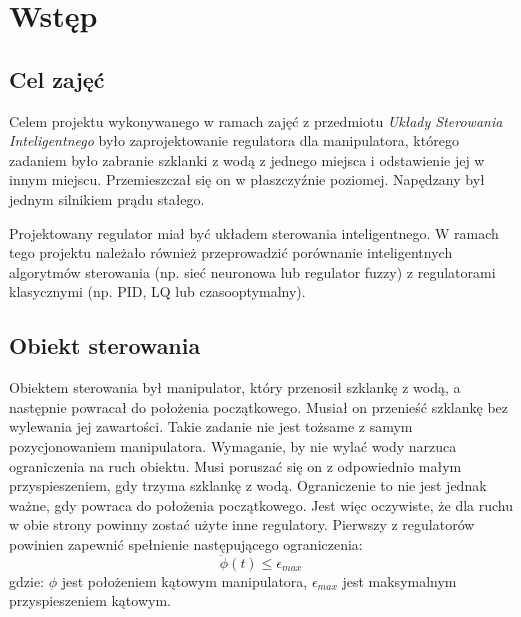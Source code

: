 \chapter{Wstęp}
\label{cha:wstep}

\section{Cel zajęć}

Celem projektu wykonywanego w ramach zajęć z przedmiotu \textit{Układy Sterowania Inteligentnego} było zaprojektowanie regulatora dla manipulatora, którego zadaniem było zabranie szklanki z wodą z jednego miejsca i odstawienie jej w innym miejscu. Przemieszczał się on w płaszczyźnie poziomej. Napędzany był jednym silnikiem prądu stałego.

Projektowany regulator miał być układem sterowania inteligentnego. W ramach tego projektu należało również przeprowadzić porównanie inteligentnych algorytmów sterowania (np. sieć neuronowa lub regulator fuzzy) z regulatorami klasycznymi (np. PID, LQ lub czasooptymalny).

\section{Obiekt sterowania}

Obiektem sterowania był manipulator, który przenosił szklankę z wodą, a następnie powracał do położenia początkowego. Musiał on przenieść szklankę bez wylewania jej zawartości. Takie zadanie nie jest tożsame z samym pozycjonowaniem manipulatora. Wymaganie, by nie wylać wody narzuca ograniczenia na ruch obiektu. Musi poruszać się on z odpowiednio małym przyspieszeniem, gdy trzyma szklankę z wodą. Ograniczenie to nie jest jednak ważne, gdy powraca do położenia początkowego. Jest więc oczywiste, że dla ruchu w obie strony powinny zostać użyte inne regulatory. Pierwszy z regulatorów powinien zapewnić spełnienie następującego ograniczenia:
\begin{equation}
\ddot \phi(t) \leqslant \epsilon_{max}
\end{equation}
\noindent gdzie:\newline
\(\phi\) jest położeniem kątowym manipulatora,\newline
\(\epsilon_{max}\) jest maksymalnym przyspieszeniem kątowym.

